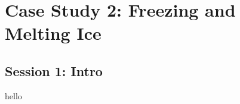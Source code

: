 \documentclass[a4paper,openany,nobib]{tufte-book}
\begin{document}
\thispagestyle{empty}
\chapter{Case Study 2: Freezing and Melting Ice} 
\setcounter{page}{1}
\section{Session 1: Intro}%
\label{sec:Session 1:}
hello
\end{document}
